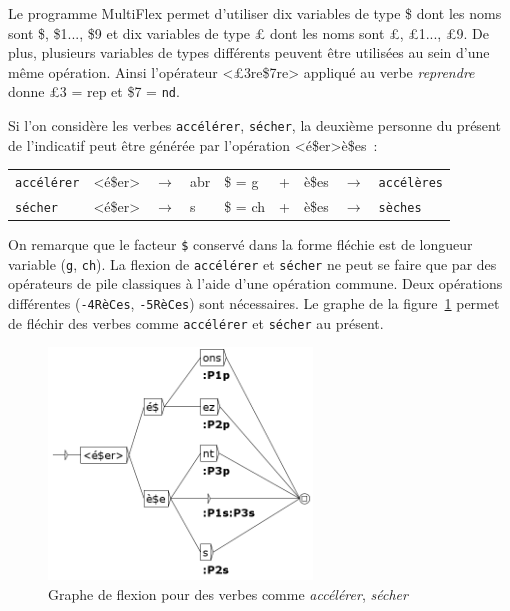 \bigskip
\noindent
Le programme MultiFlex permet d'utiliser dix variables de type \$ dont les noms sont \$, \$1..., \$9
et dix variables de type {\pounds} dont les noms sont {\pounds}, {\pounds}1..., {\pounds}9. De plus,
plusieurs variables de types différents peuvent \^etre utilisées au sein d'une m\^eme opération.
Ainsi l'opérateur <{\pounds}3re\$7re> appliqué au verbe {\it reprendre} donne {\pounds}3 = 
 rep et \$7 = \verb+nd+.

\bigskip
\noindent
Si l'on considère les verbes \verb+accélérer+, \verb+sécher+, la
deuxième personne du présent de l'indicatif peut \^etre générée par l'opération <é\$er>è\$es~:

\begin{center}
\begin{tabular}{lllllllll}
	\verb+accélérer+ & <é\$er> & $\rightarrow$ & abr & \$ = g & + & è\$es &  $\rightarrow$ & \verb+accélères+\\
	\verb+sécher+ & <é\$er> & $\rightarrow$ & s & \$ = ch & + & è\$es & $\rightarrow$ & \verb+sèches+\\
\end{tabular}
\end{center}

\noindent
On remarque que le facteur \verb+$+ conservé dans la forme fléchie est de longueur variable (\verb+g+, \verb+ch+). 
La flexion de \verb+accélérer+ et \verb+sécher+ ne peut se faire que par des opérateurs de pile
classiques \`a l'aide d'une opération commune. Deux opérations différentes (\verb+-4RèCes+, \verb+-5RèCes+) sont
nécessaires. Le graphe de la figure~\ref{fig-inflection-secher} permet de fléchir des verbes comme
\verb+accélérer+ et \verb+sécher+ au présent.

\begin{figure}[!ht]
\begin{center}
\includegraphics[width=7cm]{resources/img/fig3-Advanced_operators_with_Variables-V_secher.png}
\caption{Graphe de flexion pour des verbes comme {\it accélérer}, {\it sécher}
\label{fig-inflection-secher}}
\end{center}
\end{figure}

